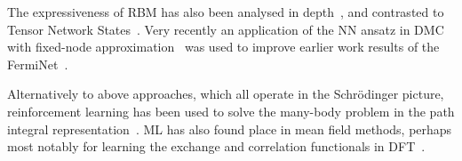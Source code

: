 The expressiveness of RBM has also been analysed in depth~\cite{carleo2018constructing}, and contrasted to Tensor Network States~\cite{clark2018unifying}. Very recently an application of the NN ansatz in DMC with fixed-node approximation~\cite{wilson2021simulations} was used to improve earlier work results of the FermiNet~\cite{pfau2020ab}.

Alternatively to above approaches, which all operate in the Schr\" odinger picture, reinforcement learning has been used to solve the many-body problem in the path integral representation~\cite{barr2020quantum, gispen2020ground}. ML has also found place in mean field methods, perhaps most notably for learning the exchange and correlation functionals in DFT~\cite{dick2020machine}.
